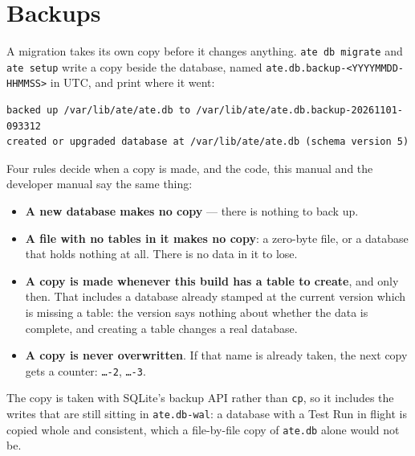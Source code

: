 \section{Backups}

A migration takes its own copy before it changes anything. \texttt{ate db migrate} and
\texttt{ate setup} write a copy beside the database, named
\texttt{ate.db.backup-<YYYYMMDD-HHMMSS>} in UTC, and print where it went:

\begin{lstlisting}[language=ATEShell]
backed up /var/lib/ate/ate.db to /var/lib/ate/ate.db.backup-20261101-093312
created or upgraded database at /var/lib/ate/ate.db (schema version 5)
\end{lstlisting}

Four rules decide when a copy is made, and the code, this manual and the developer manual say the
same thing:

\begin{itemize}
  \item \textbf{A new database makes no copy} --- there is nothing to back up.
  \item \textbf{A file with no tables in it makes no copy}: a zero-byte file, or a database that
    holds nothing at all. There is no data in it to lose.
  \item \textbf{A copy is made whenever this build has a table to create}, and only then. That
    includes a database already stamped at the current version which is missing a table: the
    version says nothing about whether the data is complete, and creating a table changes a real
    database.
  \item \textbf{A copy is never overwritten}. If that name is already taken, the next copy gets a
    counter: \texttt{\dots-2}, \texttt{\dots-3}.
\end{itemize}

The copy is taken with SQLite's backup API rather than \texttt{cp}, so it includes the writes that
are still sitting in \texttt{ate.db-wal}: a database with a Test Run in flight is copied whole and
consistent, which a file-by-file copy of \texttt{ate.db} alone would not be.

